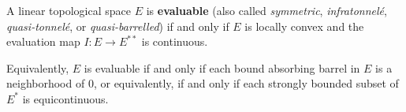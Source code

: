 A linear topological space $E$ is \textbf{evaluable} (also called \textit{symmetric}, \textit{infratonnel\'e}, \textit{quasi-tonnel\'e}, or \textit{quasi-barrelled}) if and only if $E$ is locally convex and the evaluation map $I \colon E \to E^{**}$ is continuous.

Equivalently, $E$ is evaluable if and only if each bound absorbing barrel in $E$ is a neighborhood of $0$, or equivalently, if and only if each strongly bounded subset of $E^*$ is equicontinuous.
